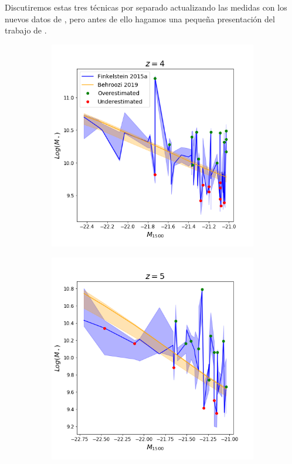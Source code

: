 Discutiremos estas tres técnicas por separado actualizando las medidas con los nuevos datos de \cite{behroozi2019universemachine}, pero antes de ello hagamos una pequeña presentación del trabajo de \cite{behroozi2019universemachine}.


	

\begin{figure}[h]
	\begin{subfigure}{.5\textwidth}
  		\centering
  		\includegraphics[width=1.1\linewidth]{Figures/sm-uv/z_4.png}
  		\label{fig:sfig1}
	\end{subfigure}%
	\begin{subfigure}{.5\textwidth}
  		\centering
  		\includegraphics[width=1.1\linewidth]{Figures/sm-uv/z_5.png}

\end{subfigure}
\end{figure}
